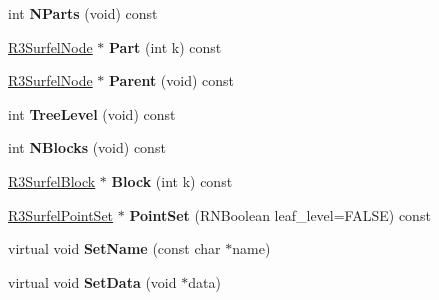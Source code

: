 \begin{DoxyCompactItemize}
\item 
int {\bfseries N\+Parts} (void) const \hypertarget{class_r3_surfel_node_ace07940402d0bb9320f6cd9232ed0115}{}\label{class_r3_surfel_node_ace07940402d0bb9320f6cd9232ed0115}

\item 
\hyperlink{class_r3_surfel_node}{R3\+Surfel\+Node} $\ast$ {\bfseries Part} (int k) const \hypertarget{class_r3_surfel_node_a185f84fc14296daf9289bdcc2a12db77}{}\label{class_r3_surfel_node_a185f84fc14296daf9289bdcc2a12db77}

\item 
\hyperlink{class_r3_surfel_node}{R3\+Surfel\+Node} $\ast$ {\bfseries Parent} (void) const \hypertarget{class_r3_surfel_node_a93a27fd8d99670bfb047ccfec927219c}{}\label{class_r3_surfel_node_a93a27fd8d99670bfb047ccfec927219c}

\item 
int {\bfseries Tree\+Level} (void) const \hypertarget{class_r3_surfel_node_ad5a2787fd43d0b931e6c6d678719f645}{}\label{class_r3_surfel_node_ad5a2787fd43d0b931e6c6d678719f645}

\item 
int {\bfseries N\+Blocks} (void) const \hypertarget{class_r3_surfel_node_abde41df5d65d62a49d61f40264de70ff}{}\label{class_r3_surfel_node_abde41df5d65d62a49d61f40264de70ff}

\item 
\hyperlink{class_r3_surfel_block}{R3\+Surfel\+Block} $\ast$ {\bfseries Block} (int k) const \hypertarget{class_r3_surfel_node_a53b6e9c696df16213d75f52bf8f47f33}{}\label{class_r3_surfel_node_a53b6e9c696df16213d75f52bf8f47f33}

\item 
\hyperlink{class_r3_surfel_point_set}{R3\+Surfel\+Point\+Set} $\ast$ {\bfseries Point\+Set} (R\+N\+Boolean leaf\+\_\+level=F\+A\+L\+SE) const \hypertarget{class_r3_surfel_node_ae441dd08f2c9f699bfaad8a21adc3c80}{}\label{class_r3_surfel_node_ae441dd08f2c9f699bfaad8a21adc3c80}

\item 
virtual void {\bfseries Set\+Name} (const char $\ast$name)\hypertarget{class_r3_surfel_node_abc1ff2482a829f79d616e55fda634bce}{}\label{class_r3_surfel_node_abc1ff2482a829f79d616e55fda634bce}

\item 
virtual void {\bfseries Set\+Data} (void $\ast$data)\hypertarget{class_r3_surfel_node_a73d855ef96921fe86a18dc69932812b5}{}\label{class_r3_surfel_node_a73d855ef96921fe86a18dc69932812b5}


\end{DoxyCompactItemize}

